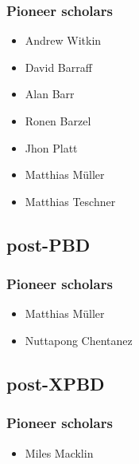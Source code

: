 \documentclass[pdflatex,sn-mathphys-num]{sn-jnl}%
\theoremstyle{thmstyleone}%
\theoremstyle{thmstyletwo}%
\theoremstyle{thmstylethree}%
\begin{document}
\subsubsection{Pioneer scholars}

	\begin{itemize}
	\item Andrew Witkin
	\item David Barraff
	\item Alan Barr
	\item Ronen Barzel
	\item Jhon Platt
	\item Matthias Müller
	\item Matthias Teschner
\end{itemize}

\subsection{post-PBD}

\subsubsection{Pioneer scholars}

\begin{itemize}
	\item Matthias Müller
	
	\item Nuttapong Chentanez
\end{itemize}

\subsection{post-XPBD}
\newpage



\subsubsection{Pioneer scholars}

\begin{itemize}
	\item Miles Macklin
\end{itemize}

\appendix
\end{document}

